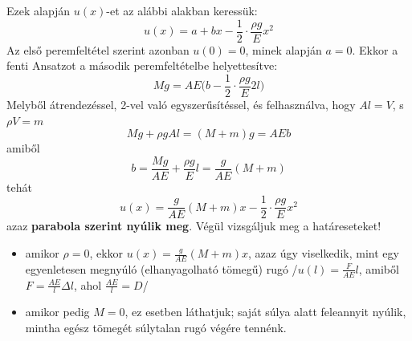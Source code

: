 \documentclass[a4paper, 12pt, titlepage]{article}
\begin{document}
Ezek alapján $u(x)$-et az alábbi alakban keressük:
\[u(x)=a+bx-\frac{1}{2}\cdot\frac{\rho g}{E}x^{2}\]
Az első peremfeltétel szerint azonban $u(0)=0$, minek alapján $a=0$. Ekkor a fenti Ansatzot a második peremfeltételbe helyettesítve:
\[Mg=AE\bigg(b-\frac{1}{2}\cdot\frac{\rho g}{E}2l\bigg)\]
Melyből átrendezéssel, 2-vel való egyszerűsítéssel, és felhasználva, hogy $Al=V$, s $\rho V=m$
\[Mg+\rho gAl=(M+m)g=AEb\]
amiből
\[b=\frac{Mg}{AE}+\frac{\rho g}{E}l=\frac{g}{AE}(M+m)\]
tehát
\[u(x)=\frac{g}{AE}(M+m)x-\frac{1}{2}\cdot\frac{\rho g}{E}x^{2}\]
azaz \textbf{parabola szerint nyúlik meg}.
\newline
Végül vizsgáljuk meg a határeseteket!
	\begin{itemize}
		\item amikor $\rho=0$, ekkor $u(x)=\frac{g}{AE}(M+m)x$, azaz úgy viselkedik, mint egy egyenletesen megnyúló (elhanyagolható tömegű) rugó /$u(l)=\frac{F}{AE}l$, amiből $F=\frac{AE}{l}\Delta l$, ahol $\frac{AE}{l}=D$/
		\item amikor pedig $M=0$, ez esetben láthatjuk; saját súlya alatt feleannyit nyúlik, mintha egész tömegét súlytalan rugó végére tennénk.
	\end{itemize}
\end{document}
